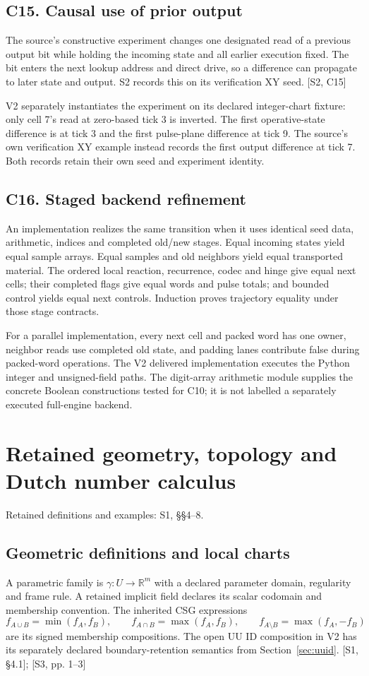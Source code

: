 \documentclass[11pt,a4paper]{article}
\numberwithin{equation}{section}
\newcommand{\newsec}[1]{\clearpage\section{#1}}
\newcommand{\src}[2]{{\sffamily\small\color{slate}[#1, #2]}}
\newcommand{\origin}[1]{{\sffamily\small\color{slate}#1}\par\vspace{3pt}}
\begin{document}
\subsection*{C15. Causal use of prior output}
The source's constructive experiment changes one designated read of a previous output bit while holding the incoming state and all earlier execution fixed. The bit enters the next lookup address and direct drive, so a difference can propagate to later state and output. S2 records this on its verification XY seed. \src{S2}{C15}

V2 separately instantiates the experiment on its declared integer-chart fixture: only cell 7's read at zero-based tick 3 is inverted. The first operative-state difference is at tick 3 and the first pulse-plane difference at tick 9. The source's own verification XY example instead records the first output difference at tick 7. Both records retain their own seed and experiment identity.

\subsection*{C16. Staged backend refinement}
An implementation realizes the same transition when it uses identical seed data, arithmetic, indices and completed old/new stages. Equal incoming states yield equal sample arrays. Equal samples and old neighbors yield equal transported material. The ordered local reaction, recurrence, codec and hinge give equal next cells; their completed flags give equal words and pulse totals; and bounded control yields equal next controls. Induction proves trajectory equality under those stage contracts.

For a parallel implementation, every next cell and packed word has one owner, neighbor reads use completed old state, and padding lanes contribute false during packed-word operations. The V2 delivered implementation executes the Python integer and unsigned-field paths. The digit-array arithmetic module supplies the concrete Boolean constructions tested for C10; it is not labelled a separately executed full-engine backend.

\newsec{Retained geometry, topology and Dutch number calculus}
\label{sec:retained}
\origin{Retained definitions and examples: S1, §§4--8.}

\subsection{Geometric definitions and local charts}
A parametric family is $\gamma:U\to\mathbb R^m$ with a declared parameter domain, regularity and frame rule. A retained implicit field declares its scalar codomain and membership convention. The inherited CSG expressions
\begin{equation}
f_{A\cup B}=\min(f_A,f_B),\qquad
f_{A\cap B}=\max(f_A,f_B),\qquad
f_{A\setminus B}=\max(f_A,-f_B)
\end{equation}
are its signed membership compositions. The open UU ID composition in V2 has its separately declared boundary-retention semantics from Section~\ref{sec:uuid}. \src{S1}{\S4.1}; \src{S3}{pp. 1--3}
\end{document}
